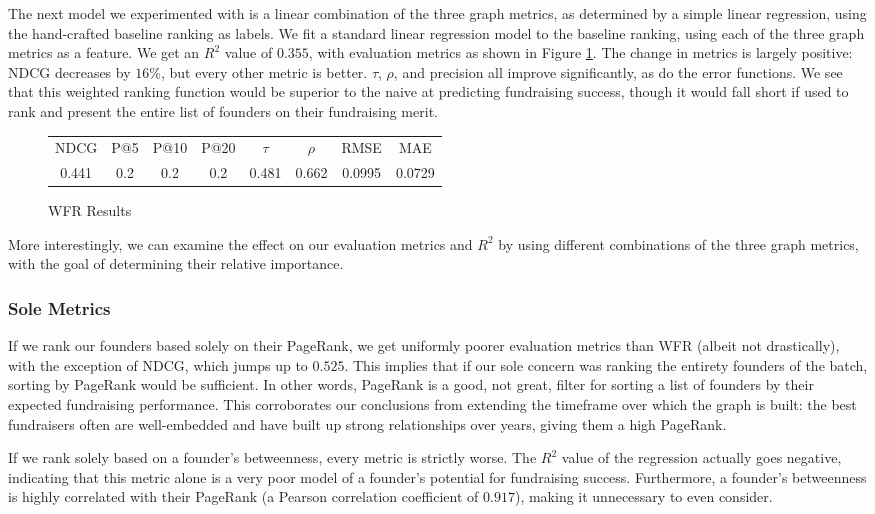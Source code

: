 The next model we experimented with is a linear combination of the three graph metrics, as determined by a simple linear regression, using the hand-crafted baseline ranking as labels. We fit a standard linear regression model to the baseline ranking, using each of the three graph metrics as a feature. We get an $R^2$ value of $0.355$, with evaluation metrics as shown in Figure \ref{fig:wfr:results}. The change in metrics is largely positive: NDCG decreases by $16\%$, but every other metric is better. $\tau$, $\rho$, and precision all improve significantly, as do the error functions. We see that this weighted ranking function would be superior to the naive at predicting fundraising success, though it would fall short if used to rank and present the entire list of founders on their fundraising merit.

\begin{figure}[ht]
\begin{tabular}{c | c | c | c | c | c | c | c}
NDCG & P@5 & P@10 & P@20 & $\tau$ & $\rho$ & RMSE & MAE  \\
0.441 & 0.2 & 0.2 & 0.2 & 0.481 & 0.662 & 0.0995 & 0.0729 \\
\end{tabular}
\centering
\caption{WFR Results}
\label{fig:wfr:results}
\end{figure}

More interestingly, we can examine the effect on our evaluation metrics and $R^2$ by using different combinations of the three graph metrics, with the goal of determining their relative importance.

\subsubsection{Sole Metrics}

If we rank our founders based solely on their PageRank, we get uniformly poorer evaluation metrics than WFR (albeit not drastically), with the exception of NDCG, which jumps up to $0.525$. This implies that if our sole concern was ranking the entirety founders of the batch, sorting by PageRank would be sufficient. In other words, PageRank is a good, not great, filter for sorting a list of founders by their expected fundraising performance. This corroborates our conclusions from extending the timeframe over which the graph is built: the best fundraisers often are well-embedded and have built up strong relationships over years, giving them a high PageRank.

If we rank solely based on a founder's betweenness, every metric is strictly worse. The $R^2$ value of the regression actually goes negative, indicating that this metric alone is a very poor model of a founder's potential for fundraising success. Furthermore, a founder's betweenness is highly correlated with their PageRank (a Pearson correlation coefficient of $0.917$), making it unnecessary to even consider.

